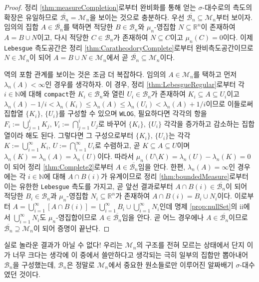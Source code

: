 \begin{proof}
    정리 \ref{thm:measureCompletion}로부터 완비화를 통해 얻는 $\sigma$-대수로의 측도의 확장은 유일하므로 $\overline{\mathcal{B}_n}=\mathcal{M}_n$을 보이는 것으로 충분하다. 우선 $\overline{\mathcal{B}_n}\subseteq\mathcal{M}_n$부터 보이자. 임의의 집합 $A\in\overline{\mathcal{B}_n}$를 택하면 적당한 $B\in\mathcal{B}_n$와 $\mu_n$-영집합 $N\subseteq\mathbb{R}^n$이 존재하여 $A=B\cup N$이고, 다시 적당한 $C\in\mathcal{B}_n$가 존재하여 $N\subseteq C$이고 $\mu_n(C)=0$이다. 이제 \texttt{Lebesgue} 측도공간은 정리 \ref{thm:CaratheodoryComplete}로부터 완비측도공간이므로 $N\in\mathcal{M}_n$이 되어 $A=B\cup N\in\mathcal{M}_n$에서 곧 $\overline{\mathcal{B}_n}\subseteq\mathcal{M}_n$이다.

    역의 포함 관계를 보이는 것은 조금 더 복잡하다. 임의의 $A\in\mathcal{M}_n$를 택하고 먼저 $\lambda_n(A)<\infty$인 경우를 생각하자. 이 경우, 정리 \ref{thm:LebesgueRegular}로부터 각 $i\in\mathbb{N}$에 대해 \texttt{compact}한 $K_i\in\mathcal{B}_n$와 열린 $U_i\in\mathcal{B}_n$가 존재하여 $K_i\subseteq A\subseteq U_i$이고 $\lambda_n(A)-1/i<\lambda_n(K_i)\leq\lambda_n(A)\leq\lambda_n(U_i)<\lambda_n(A)+1/i$이므로 이들로써 집합열 $\{K_i\},\,\{U_i\}$를 구성할 수 있으며 \texttt{WLOG}, 필요하다면 각각의 항을 $F_i:=\bigcup_{j=1}^iK_j,\,V_i:=\bigcap_{j=1}^iU_j$로 바꾸어 $\{K_i\},\,\{U_i\}$ 각각을 증가하고 감소하는 집합열이라 해도 된다. 그렇다면 그 구성으로부터 $\{K_i\},\,\{U_i\}$는 각각 $K:=\bigcup_{i=1}^\infty K_i,\,U:=\bigcap_{i=1}^\infty U_i$로 수렴하고, 곧 $K\subseteq A\subseteq U$이며 $\lambda_n(K)=\lambda_n(A)=\lambda_n(U)$이다. 따라서 $\mu_n(U\setminus K)=\lambda_n(U)-\lambda_n(K)=0$이 되어 정리 \ref{thm:Complete2}로부터 $A\in\overline{\mathcal{B}_n}$임을 안다. 한편, $\lambda_n(A)=\infty$인 경우에는 각 $i\in\mathbb{N}$에 대해 $A\cap B(i)$가 유계이므로 정리 \ref{thm:boundedMeasure}로부터 이는 유한한 \texttt{Lebesgue} 측도를 가지고, 곧 앞선 결과로부터 $A\cap B(i)\in\overline{\mathcal{B}_n}$이 되어 적당한 $B_i\in\mathcal{B}_n$과 $\mu_n$-영집합 $N_i\subseteq\mathbb{R}^n$가 존재하여 $A\cap B(i)=B_i\cup N_i$이다. 이로부터 $A=\bigcup_{i=1}^\infty[A\cap B(i)]=\bigcup_{i=1}^\infty B_i\cup\bigcup_{i=1}^\infty N_i$인데 명제 \ref{prop:nullSet}의 ii에서 $\bigcup_{i=1}^\infty N_i$도 $\mu_n$-영집합이므로 $A\in\overline{\mathcal{B}_n}$임을 안다. 곧 어느 경우에나 $A\in\overline{\mathcal{B}_n}$이므로 $\overline{\mathcal{B}_n}\supseteq\mathcal{M}_n$이 되어 증명이 끝난다.
\end{proof}

실로 놀라운 결과가 아닐 수 없다! 우리는 $\mathcal{M}_n$의 구조를 전혀 모르는 상태에서 단지 이가 너무 크다는 생각에 이 중에서 쓸만하다고 생각되는 극히 일부의 집합만 뽑아내어 $\mathcal{B}_n$을 구성했는데, $\mathcal{B}_n$은 정말로 $\mathcal{M}_n$에서 중요한 원소들로만 이루어진 알짜배기 $\sigma$-대수였던 것이다.

